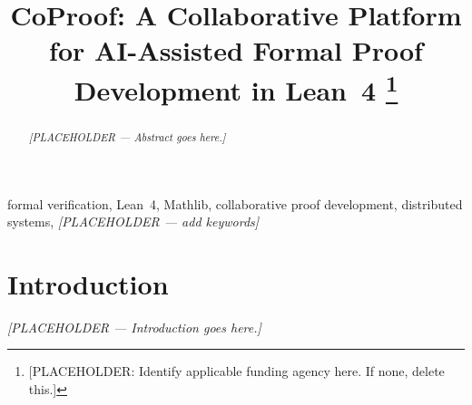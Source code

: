 \documentclass[conference]{IEEEtran}
\begin{document}
\title{CoProof: A Collaborative Platform for AI-Assisted Formal
Proof Development in Lean~4%
\thanks{[PLACEHOLDER: Identify applicable funding agency here. If none, delete this.]}
}

\author{
\and
{}
\and
{}
}

\maketitle

\begin{abstract}
\textit{[PLACEHOLDER --- Abstract goes here.]}
\end{abstract}

\begin{IEEEkeywords}
formal verification, Lean~4, Mathlib, collaborative proof development,
distributed systems, \textit{[PLACEHOLDER --- add keywords]}
\end{IEEEkeywords}

\section{Introduction}
\label{sec:introduction}
\textit{[PLACEHOLDER --- Introduction goes here.]}

\end{document}
